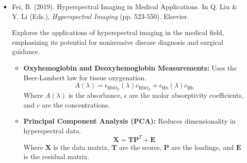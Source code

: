 \documentclass[10pt,svgnames,fragile]{beamer}
\begin{document}
\begin{frame}{}
\tiny
\begin{itemize}

    \item Fei, B. (2019). Hyperspectral Imaging in Medical Applications. In Q. Liu \& Y. Li (Eds.), \textit{Hyperspectral Imaging} (pp. 523-550). Elsevier. \href{https://doi.org/10.1016/B978-0-444-63977-6.00021-3}{\color{blue}{DOI: 10.1016/B978-0-444-63977-6.00021-3}} \cite{feiHyperspectralImagingMedical2019}
    
    {\color{gray}Explores the applications of hyperspectral imaging in the medical field, emphasizing its potential for noninvasive disease diagnosis and surgical guidance.}
    \begin{itemize} \tiny
    \item \textbf{Oxyhemoglobin and Deoxyhemoglobin Measurements:} Uses the Beer-Lambert law for tissue oxygenation.
    \[
    A(\lambda) = \epsilon_{\text{HbO}_2}(\lambda) c_{\text{HbO}_2} + \epsilon_{\text{Hb}}(\lambda) c_{\text{Hb}}
    \]
    Where \( A(\lambda) \) is the absorbance, \( \epsilon \) are the molar absorptivity coefficients, and \( c \) are the concentrations.
    \item \textbf{Principal Component Analysis (PCA):} Reduces dimensionality in hyperspectral data.
    \[
    \mathbf{X} = \mathbf{TP}^T + \mathbf{E}
    \]
    Where \( \mathbf{X} \) is the data matrix, \( \mathbf{T} \) are the scores, \( \mathbf{P} \) are the loadings, and \( \mathbf{E} \) is the residual matrix.
    \end{itemize}

\end{itemize}
\end{frame}
\end{document}
